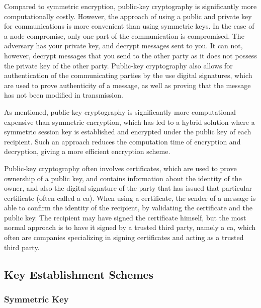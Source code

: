 Compared to symmetric encryption, public-key cryptography is significantly more computationally costly. However, the approach of using a public and private key for communications is more convenient than using symmetric keys. In the case of a node compromise, only one part of the communication is compromised. The adversary has your private key, and decrypt messages sent to you. It can not, however, decrypt messages that you send to the other party as it does not possess the private key of the other party. Public-key cryptography also allows for authentication of the communicating parties by the use digital signatures, which are used to prove authenticity of a message, as well as proving that the message has not been modified in transmission.


As mentioned, public-key cryptography is significantly more computational expensive than symmetric encryption, which has led to a hybrid solution where a symmetric session key is established and encrypted under the public key of each recipient. Such an approach reduces the computation time of encryption and decryption, giving a more efficient encryption scheme.

Public-key cryptography often involves certificates, which are used to prove ownership of a public key, and contains information about the identity of the owner, and also the digital signature of the party that has issued that particular certificate (often called a \gls{ca}). When using a certificate, the sender of a message is able to confirm the identity of the recipient, by validating the certificate and the public key. The recipient may have signed the certificate himself, but the most normal approach is to have it signed by a trusted third party, namely a \gls{ca}, which often are companies specializing in signing certificates and acting as a trusted third party.

\subsection{Key Establishment Schemes}

\label{subsec:keys-schems}

\subsubsection{Symmetric Key}

